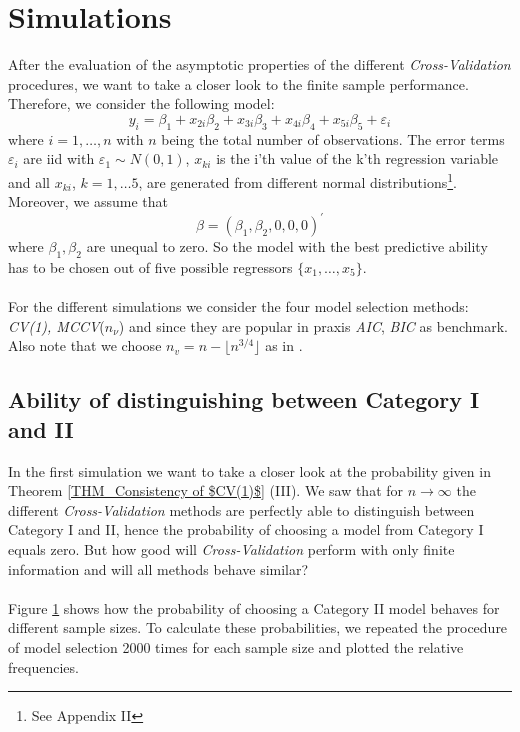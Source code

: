 \documentclass[Research_Module_ES.tex]{subfiles}
\begin{document}
\section{Simulations}
\label{Simulation1}
After the evaluation of the asymptotic properties of the different \textit{Cross-Validation} procedures, we want to take a closer look to the finite sample performance. Therefore, we consider the following model:
\begin{equation}
\label{SimulationModel}
y_i=\beta_1+x_{2i}\beta_2+x_{3i}\beta_3+x_{4i}\beta_4+x_{5i}\beta_5+\varepsilon_i
\end{equation}
where $i=1,\ldots,n$ with $n$ being the total number of observations. The error terms $\varepsilon_i$ are iid with $\varepsilon_1\sim N(0,1)$,  $x_{ki}$ is the i'th value of the k'th regression variable and all $x_{ki}$, $k=1,\ldots5$, are generated from different normal distributions\footnote{See Appendix II}. Moreover, we assume that
\[
	\beta=(\beta_1,\beta_2,0,0,0)^\prime
\]
where $\beta_1,\beta_2$ are unequal to zero. So the model with the best predictive ability has to be chosen out of five possible regressors $\{x_1,\ldots,x_5\}$. \\
\\
For the different simulations we consider the four model selection methods: \textit{CV(1), MCCV}($n_\nu$) and since they are popular in praxis \textit{AIC}, \textit{BIC} as benchmark. Also note that we choose $n_v=n-\lfloor n^{3/4}\rfloor$ as in \cite{shao}.

\subsection{Ability of distinguishing between Category I and II }
In the first simulation we want to take a closer look at the probability given in Theorem \ref{THM_Consistency of $CV(1)$} (III). We saw that for $n\to\infty$ the different \textit{Cross-Validation} methods are perfectly able to distinguish between Category I and II, hence the probability of choosing a model from Category I equals zero. But how good will \textit{Cross-Validation} perform with only finite information and will all methods behave similar?\\
\\
Figure \ref{Simulation1} shows how the probability of choosing a Category II model behaves for different sample sizes. To calculate these probabilities, we repeated the procedure of model selection 2000 times for each sample size and plotted the relative frequencies.
\end{document}

